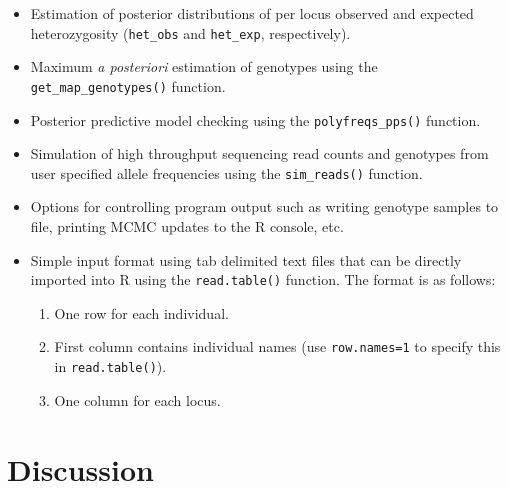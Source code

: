 \documentclass[11pt,english,letterpaper,oneside]{article}
\begin{document}
\begin{itemize}
	\item Estimation of posterior distributions of per locus observed and expected heterozygosity (\texttt{het\_obs} and \texttt{het\_exp}, respectively).
	\item Maximum \textit{a posteriori} estimation of genotypes using the \texttt{get\_map\_genotypes()} function.
	\item Posterior predictive model checking using the \texttt{polyfreqs\_pps()} function.
	\item Simulation of high throughput sequencing read counts and genotypes from user specified allele frequencies using the \texttt{sim\_reads()} function.
	\item Options for controlling program output such as writing genotype samples to file, printing MCMC updates to the R console, etc.
	\item Simple input format using tab delimited text files that can be directly imported into R using the \texttt{read.table()} function. The format is as follows:
	\begin{enumerate}
		\item One row for each individual.
		\item First column contains individual names (use \texttt{row.names=1} to specify this in \texttt{read.table()}).
		\item One column for each locus.
	\end{enumerate}
\end{itemize}
\medskip


\medskip

\section{Discussion}         %
\end{document}
